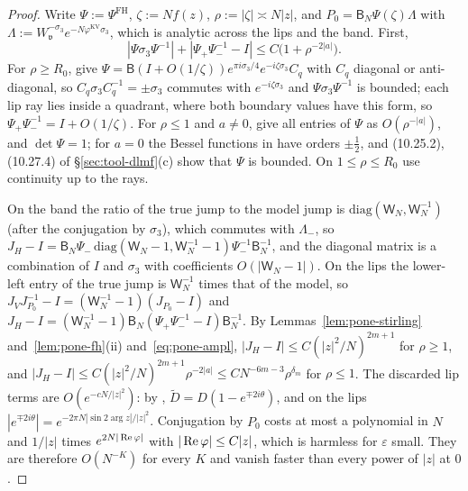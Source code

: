 \begin{proof}
Write $\Psi:=\Psi^{\mathrm{FH}}$, $\zeta:=Nf(z)$, $\rho:=|\zeta|\asymp N|z|$, and $P_0=\mathsf B_N\Psi(\zeta)\Lambda$ with
$\Lambda:=W_{\mathfrak v}^{-\sigma_3}e^{-N\varphi^{\mathrm{KV}}\sigma_3}$, which is analytic across the lips and the band. First,
\begin{equation}\label{eq:pone-ampl}
  |\Psi\sigma_3\Psi^{-1}|+|\Psi_+\Psi_-^{-1}-I|\le C\bigl(1+\rho^{-2|a|}\bigr).
\end{equation}
For $\rho\ge R_0$, \cite[(4.43)--(4.46)]{Van} give $\Psi=\mathsf B(I+O(1/\zeta))e^{\pi i\sigma_3/4}e^{-i\zeta\sigma_3}C_q$ with $C_q$
diagonal or anti-diagonal, so $C_q\sigma_3C_q^{-1}=\pm\sigma_3$ commutes with $e^{-i\zeta\sigma_3}$ and $\Psi\sigma_3\Psi^{-1}$ is bounded;
each lip ray lies inside a quadrant, where both boundary values have this form, so $\Psi_+\Psi_-^{-1}=I+O(1/\zeta)$. For
$\rho\le1$ and $a\ne0$, \cite[(5.21)--(5.22)]{KV} give all entries of $\Psi$ as $O(\rho^{-|a|})$, and $\det\Psi=1$; for $a=0$
the Bessel functions in \cite[(4.26)--(4.33)]{Van} have orders $\pm\frac12$, and (10.25.2), (10.27.4) of
\S\ref{sec:tool-dlmf}(c) show that $\Psi$ is bounded. On $1\le\rho\le R_0$ use continuity up to the rays.

On the band the ratio of the true jump to the model jump is $\mathrm{diag}(\mathsf W_N,\mathsf W_N^{-1})$ (after the
conjugation by $\sigma_3$), which commutes with $\Lambda_-$, so $J_H-I=\mathsf B_N\Psi_-\,\mathrm{diag}(\mathsf W_N-1,
\mathsf W_N^{-1}-1)\Psi_-^{-1}\mathsf B_N^{-1}$, and the diagonal matrix is a combination of $I$ and $\sigma_3$ with coefficients
$O(|\mathsf W_N-1|)$. On the lips the lower-left entry of the true jump is $\mathsf W_N^{-1}$ times that of the model, so
$J_VJ_{P_0}^{-1}-I=(\mathsf W_N^{-1}-1)(J_{P_0}-I)$ and $J_H-I=(\mathsf W_N^{-1}-1)\mathsf B_N(\Psi_+\Psi_-^{-1}-I)\mathsf B_N^{-1}$.
By Lemmas~\ref{lem:pone-stirling} and~\ref{lem:pone-fh}(ii) and~\eqref{eq:pone-ampl}, $|J_H-I|\le C(|z|^2/N)^{2m+1}$ for
$\rho\ge1$, and $|J_H-I|\le C(|z|^2/N)^{2m+1}\rho^{-2|a|}\le CN^{-6m-3}\rho^{\delta_m}$ for $\rho\le1$. The discarded lip terms
are $O(e^{-cN/|z|^2})$: by \cite[(4.16)]{WLXZ}, $\tilde D=D(1-e^{\mp2i\theta})$, and on the lips
$|e^{\mp2i\theta}|=e^{-2\pi N|\sin2\arg z|/|z|^2}$. Conjugation by $P_0$ costs at most a polynomial in $N$ and $1/|z|$ times
$e^{2N|\operatorname{Re}\varphi|}$ with $|\operatorname{Re}\varphi|\le C|z|$, which is harmless for $\varepsilon$ small. They are therefore $O(N^{-K})$
for every $K$ and vanish faster than every power of $|z|$ at $0$.
\end{proof}

